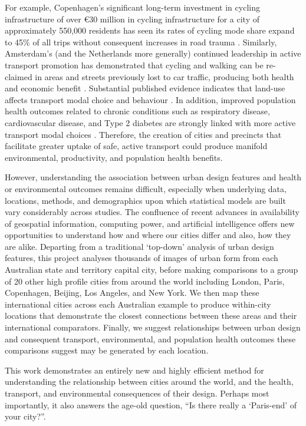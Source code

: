 \documentclass[sageh,times]{sagej}
\begin{document}
For example, Copenhagen's significant long-term investment in cycling infrastructure of over \euro 30 million in cycling infrastructure for a city of approximately 550,000 residents has seen its rates of cycling mode share expand to 45\% of all trips without consequent increases in road trauma \citep{Kaplan2014}. Similarly, Amsterdam's (and the Netherlands more generally) continued leadership in active transport promotion has demonstrated that cycling and walking can be re-claimed in areas and streets previously lost to car traffic, producing both health and economic benefit \citep{Andersen2000}. Substantial published evidence indicates that land-use affects transport modal choice and behaviour  \citep{Giles-corti2016,Kleinert2016,Goenka2016}. In addition, improved population health outcomes related to chronic conditions such as respiratory disease, cardiovascular disease, and Type 2 diabetes are strongly linked with more active transport modal choices  \citep{Zapata-Diomedi2017}. Therefore, the creation of cities and precincts that facilitate greater uptake of safe, active transport could produce manifold environmental, productivity, and population health benefits. 

However, understanding the association between urban design features and health or environmental outcomes remains difficult, especially when underlying data, locations, methods, and demographics upon which statistical models are built vary considerably across studies. The confluence of recent advances in availability of geospatial information, computing power, and artificial intelligence offers new opportunities to understand how and where our cities differ and also, how they are alike. Departing from a traditional `top-down' analysis of urban design features, this project analyses thousands of images of urban form from each Australian state and territory capital city, before making comparisons to a group of 20 other high profile cities from around the world including London, Paris, Copenhagen, Beijing, Los Angeles, and New York. We then map these international cities across each Australian example to produce within-city locations that demonstrate the closest connections between these areas and their international comparators. Finally, we suggest relationships between urban design and consequent transport, environmental, and population health outcomes these comparisons suggest may be generated by each location.

This work demonstrates an entirely new and highly efficient method for understanding the relationship between cities around the world, and the health, transport, and environmental consequences of their design. Perhaps most importantly, it also answers the age-old question, ``Is there really a `Paris-end' of your city?''.
\end{document}
